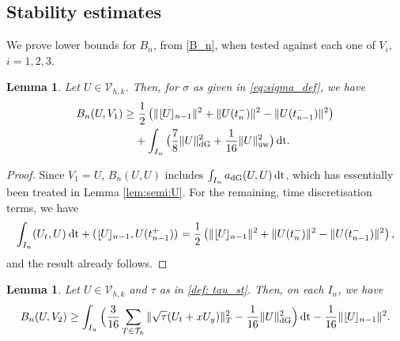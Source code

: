 \documentclass{amsart}
\newcommand{\norm}[2]{\|{#1}\|_{{#2}}}
\newcommand{\tjump}[1]{\lfloor\kern-0.4mm{#1}\kern-0.4mm\rfloor}
\newcommand{\inner}[3]{({#1},{#2})_{{#3}}}
\newcommand{\Th}{\mathcal{T}_h}
\newcommand{\dt}{\,{\rm dt}}
\newtheorem{lemma}[theorem]{Lemma}
\theoremstyle{definition}
\theoremstyle{remark}
\numberwithin{equation}{section}
\begin{document}
\subsection{Stability estimates}
We prove lower bounds for $B_n$, from \eqref{B_n}, when tested against each one of $V_i$, $i=1,2,3$.
\begin{lemma}\label{eq:energy_st}
    Let $U \in  {\mathcal{V}}_{h,k}$. Then, for $\sigma$ as given in \eqref{eq:sigma_def}, we have
    \begin{equation*}
        \begin{split}
            B_n(U,V_1)
            \geq &\  \frac{1}{2} \left( \norm{\tjump{U}_{n-1}}{}^2 + \norm{U(t_n^-)}{}^2  - \norm{U(t_{n-1}^-)}{}^2\right)
            \\
            &+\int_{I_n}   \big(
            \frac{7}{8}\norm{U}{\rm dG}^2
            +\frac{1}{16}\norm{U}{\rm uw}^2\big) \dt .
        \end{split}\end{equation*}
\end{lemma}
\begin{proof}
    Since $V_1=U$, $B_n(U,U)$ includes $\int_{I_n}a_{\rm dG}(U,U) \dt$, which has essentially been treated in Lemma \ref{lem:semi:U}.
    For the remaining, time discretisation terms, we have
    \begin{equation*}
        \int_{I_n} \inner{U_t}{U}{}\dt
        +
        \inner{\tjump{U}_{n-1}}{U(t_{n-1}^+)}{}
        =
        \frac{1}{2} \left( \norm{\tjump{U}_{n-1}}{}^2 + \norm{U(t_n^-)}{}^2 - \norm{U(t_{n-1}^-)}{}^2 \right),
    \end{equation*}
and the result already follows.
\end{proof}
\begin{lemma}\label{eq:SUPG_st}
    Let $U \in  {\mathcal{V}}_{h,k}$ and $\tau$ as in \eqref{def: tau_st}. Then, on each $I_n$, we have
    \begin{equation}
        B_n(U,V_2)
        \geq
        \int_{I_n} \Big( \frac{3}{16} \sum_{T \in \Th} \norm{ \sqrt{\tau}(U_t + xU_y) }{T}^2 - \frac{1}{16} \norm{U}{\rm dG}^2 \Big) \dt
        - \frac{1}{16}\norm{\tjump{U}_{n-1}}{}^2.
    \end{equation}
\end{lemma}
\end{document}
